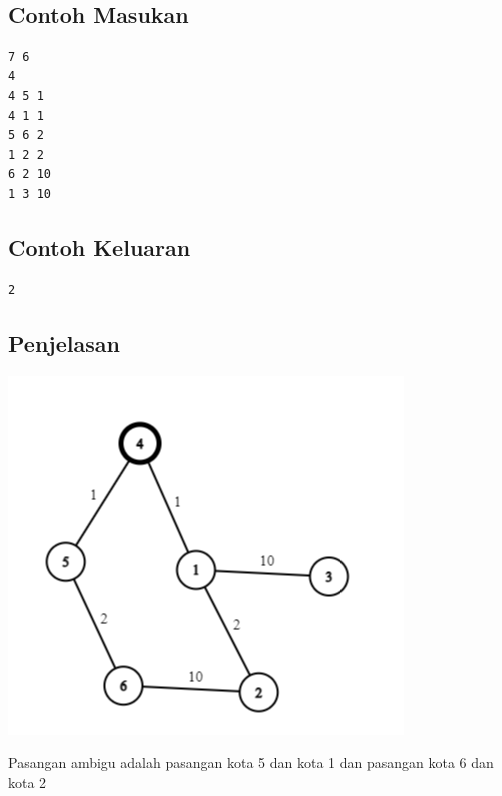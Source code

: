 \documentclass{article}
\begin{document}
\\

\begin{multicols}{2}
\subsection*{Contoh Masukan}
\begin{lstlisting}
7 6
4
4 5 1
4 1 1
5 6 2
1 2 2
6 2 10
1 3 10

\end{lstlisting}
\columnbreak
\subsection*{Contoh Keluaran}
\begin{lstlisting}
2 
\end{lstlisting}
\vfill
\null
\end{multicols}


\pagebreak
\subsection*{Penjelasan}
\begin{center}
    \includegraphics{graph.png}
\end{center}
Pasangan ambigu adalah pasangan kota 5 dan kota 1 dan pasangan kota 6 dan kota 2


\pagebreak
\end{document}
